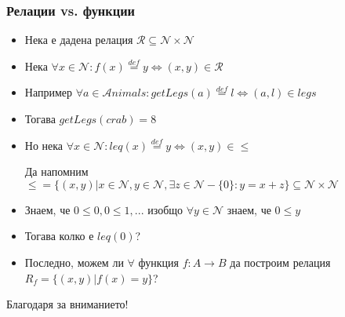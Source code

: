 \documentclass{beamer}
\begin{document}
\begin{frame}[fragile]
\frametitle{Релации vs. функции}
\begin{itemize}
  \item Нека е дадена релация $\mathcal{R} \subseteq \mathcal{N} \times \mathcal{N}$
  \item Нека $\forall x \in \mathcal{N}: f(x) \stackrel{def}{=}y \Leftrightarrow (x,y) \in \mathcal{R}$
  \vspace{1em}
  \pause
  \item Например $\forall a \in \mathcal{A}nimals:getLegs(a)\stackrel{def}{=}l \Leftrightarrow (a,l) \in legs$
  \item Тогава $getLegs(crab)=8$
  \vspace{1em}
  \pause
  \item Но нека $\forall x \in \mathcal{N}:leq(x)\stackrel{def}{=}y \Leftrightarrow (x,y) \in \leq$
  \begin{flushleft}
  Да напомним $\leq=\{(x,y)|x \in \mathcal{N}, y \in \mathcal{N}, \exists z \in \mathcal{N}-\{0\}:y=x+z\} \subseteq \mathcal{N} \times \mathcal {N}$
  \end{flushleft}
  \item Знаем, че $0 \leq 0, 0 \leq 1,...$ изобщо $\forall y \in \mathcal{N}$ знаем, че $0 \leq y$
  \item Тогава колко е $leq(0)$?
   \vspace{1em}
  \pause
  \item Последно, можем ли $\forall$ функция $f:A\rightarrow B$ да построим релация $R_f=\{(x,y)|f(x)=y\}$?
\end{itemize}
\end{frame}

\begin{frame}
\centerline{Благодаря за вниманието!}
\end{frame}
\end{document}
